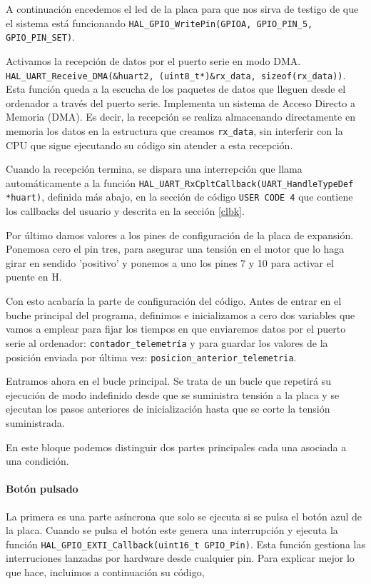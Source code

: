 A continuación encedemos el led de la placa para que nos sirva de testigo de que el sistema está funcionando \texttt{HAL\_GPIO\_WritePin(GPIOA, GPIO\_PIN\_5, GPIO\_PIN\_SET)}.

Activamos la recepción de datos por el puerto serie en modo DMA. \texttt{HAL\_UART\_Receive\_DMA(\&huart2, (uint8\_t*)\&rx\_data, sizeof(rx\_data))}.
Esta función queda a la escucha de los paquetes de datos que lleguen desde el ordenador a través del puerto serie. Implementa un sistema de Acceso Directo a Memoria (DMA). Es decir, la recepción se realiza almacenando directamente en memoria los datos en la estructura que creamos \texttt{rx\_data}, sin interferir con la CPU que sigue ejecutando su código sin atender a esta recepción.

Cuando la recepción termina, se dispara una interrepción que llama automáticamente a la función \texttt{HAL\_UART\_RxCpltCallback(UART\_HandleTypeDef *huart)}, definida más abajo, en la sección de código \texttt{USER CODE 4} que contiene los callbacks del usuario y descrita en la sección \ref{clbk}.

Por último damos valores a los pines de configuración de la placa de expansión. Ponemosa cero el pin tres, para asegurar una tensión en el motor que lo haga girar en sendido 'positivo' y ponemos a uno los pines 7 y 10 para activar el puente en H.

Con esto acabaría la parte de configuración del código. Antes de entrar en el buche principal del programa, definimos e inicializamos a cero dos variables que vamos a emplear para fijar los tiempos en que enviaremos datos por el puerto serie al ordenador: \texttt{contador\_telemetría} y para guardar los valores de la posición enviada por última vez: \texttt{posicion\_anterior\_telemetria}. 

Entramos ahora en el bucle principal. Se trata de un bucle que repetirá su ejecución de modo indefinido desde que se suministra tensión a la placa y se ejecutan los pasos anteriores de inicialización hasta que se corte la tensión suministrada. 

En este bloque podemos distinguir dos partes principales cada una asociada a una condición. 


\paragraph{Botón pulsado}
La primera es una parte asíncrona que solo se ejecuta si se pulsa el botón azul de la placa. Cuando se pulsa el botón este genera una interrupción y ejecuta la función \texttt{HAL\_GPIO\_EXTI\_Callback(uint16\_t GPIO\_Pin)}. Esta función gestiona las interruciones lanzadas por hardware desde cualquier pin. Para explicar mejor lo que hace, incluimos a continuación su código,

